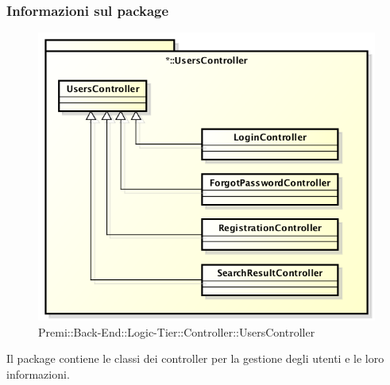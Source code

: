 	\subsubsection*{Informazioni sul package}
		\begin{figure}[h]
			\centering
			\includegraphics[width=0.9\linewidth]{img/back-end_logic-tier_controller_userscontroller}
			\caption[Premi::Back-End::Logic-Tier::Controller::UsersController]{Premi::Back-End::Logic-Tier::Controller::UsersController}
		\end{figure}
	Il package contiene le classi dei controller per la gestione degli utenti e le loro informazioni.
	
